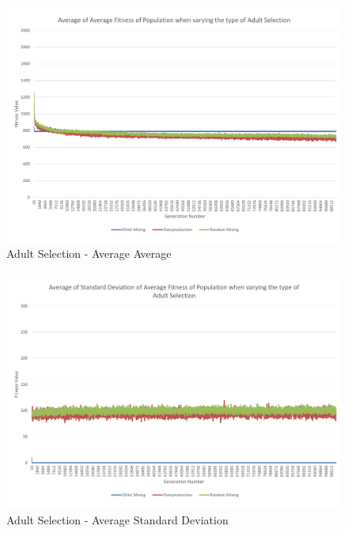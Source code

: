 \begin{landscape}
\begin{figure}[thbp]
	\centerline{\includegraphics[height=0.945\textwidth]{figures/CircleTests/AdultSelection/CircleTestAdultSelectionAverageAverage.pdf}}
	\caption{Adult Selection - Average Average}
	\label{fig:ctasaa}
\end{figure}
\end{landscape}

\begin{landscape}
\begin{figure}[thbp]
	\centerline{\includegraphics[height=0.945\textwidth]{figures/CircleTests/AdultSelection/CircleTestAdultSelectionAverageStandardDeviation.pdf}}
	\caption{Adult Selection - Average Standard Deviation}
	\label{fig:ctasasd}
\end{figure}
\end{landscape}

